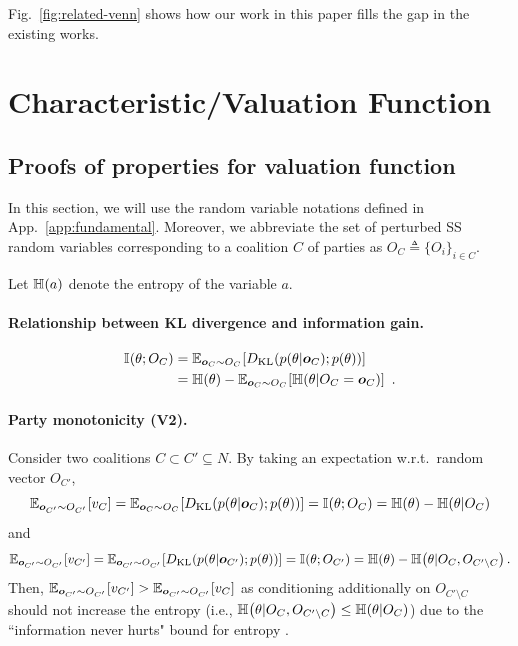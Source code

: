 \documentclass{article}
\theoremstyle{plain}
\theoremstyle{definition}
\theoremstyle{remark}
\begin{document}
Fig.~\ref{fig:related-venn} shows how our work in this paper fills the gap in the existing works.



\section{Characteristic/Valuation Function}\label{app:valuation}
\subsection{Proofs of properties for valuation function}\label{app:valproof}

In this section, we will use the random variable notations defined in App.~\ref{app:fundamental}. Moreover, we abbreviate the set of perturbed SS random variables corresponding to a coalition $C$ of parties as $O_C \triangleq \{O_i\}_{i \in C}$.

Let $\mathbb{H}\hspace{-0.5mm}\left(a\right)$ denote the entropy of the variable $a$.

\paragraph{Relationship between KL divergence and information gain.}

\begin{align*}
\mathbb{I}\hspace{-0.5mm}\left(\theta; O_C\right) &= \mathbb{E}_{{\bm{o}}_C \sim O_C}\hspace{-0.5mm}\left[D_{\mathrm{KL}}\hspace{-0.5mm}\left({p(\theta|{\bm{o}}_C)};{p(\theta)}\right)\right] \\
&= \mathbb{H}\hspace{-0.5mm}\left(\theta\right) - \mathbb{E}_{{\bm{o}}_C \sim O_C}\hspace{-0.5mm}\left[\mathbb{H}\hspace{-0.5mm}\left(\theta|O_C={\bm{o}}_C\right)\right]\ .
\end{align*}

\paragraph{Party monotonicity (V2).}

Consider two coalitions $C \subset C' \subseteq N$.
By taking an expectation w.r.t.~random vector $O_{C'}$, 
\[
\mathbb{E}_{{\bm{o}}_{C'} \sim O_{C'}}\hspace{-0.5mm}\left[v_{C}\right] = \mathbb{E}_{{\bm{o}}_C \sim O_C}\hspace{-0.5mm}\left[D_{\mathrm{KL}}\hspace{-0.5mm}\left({p(\theta|{\bm{o}}_C)};{p(\theta)}\right)\right] = \mathbb{I}\hspace{-0.5mm}\left(\theta; O_C\right) = \mathbb{H}\hspace{-0.5mm}\left(\theta\right) - \mathbb{H}\hspace{-0.5mm}\left(\theta|O_C\right)
\]
and  
\[
\mathbb{E}_{{\bm{o}}_{C'} \sim O_{C'}}\hspace{-0.5mm}\left[v_{C'}\right] = \mathbb{E}_{{\bm{o}}_{C'} \sim O_{C'}}\hspace{-0.5mm}\left[D_{\mathrm{KL}}\hspace{-0.5mm}\left({p(\theta|{\bm{o}}_{C'})};{p(\theta)}\right)\right] = \mathbb{I}\hspace{-0.5mm}\left(\theta; O_{C'}\right) =  \mathbb{H}\hspace{-0.5mm}\left(\theta\right) - \mathbb{H}\hspace{-0.5mm}\left(\theta|O_C, O_{C' \setminus C}\right) .
\]
Then, $\mathbb{E}_{{\bm{o}}_{C'} \sim O_{C'}}\hspace{-0.5mm}\left[v_{C'}\right] > \mathbb{E}_{{\bm{o}}_{C'} \sim O_{C'}}\hspace{-0.5mm}\left[v_{C}\right] $ as conditioning additionally on $O_{C' \setminus C}$ should not increase the entropy (i.e., $\mathbb{H}\hspace{-0.5mm}\left(\theta|O_C, O_{C' \setminus C}\right) \leq \mathbb{H}\hspace{-0.5mm}\left(\theta|O_C\right)$) due to the ``information never hurts" bound for entropy \cite{Cover91}. 
\end{document}
